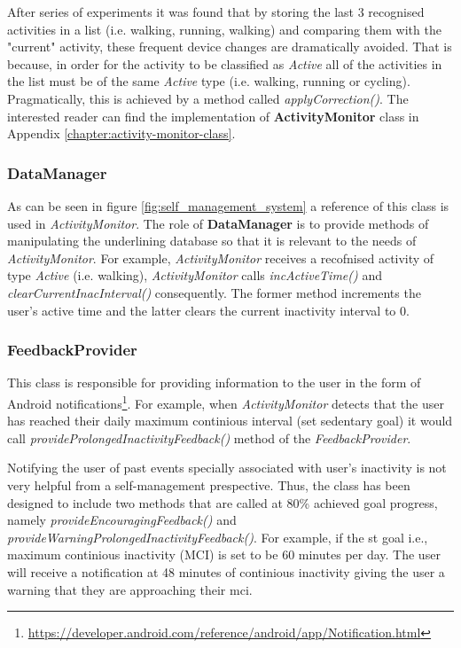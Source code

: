     After series of experiments it was found that by storing the last 3 recognised activities in a list (i.e. walking, running, walking) and comparing them with the "current" activity, these frequent device changes are dramatically avoided. That is because, in order for the activity to be classified as \textit{Active} all of the activities in the list must be of the same \textit{Active} type (i.e. walking, running or cycling). Pragmatically, this is achieved by a method called \textit{applyCorrection()}. The interested reader can find the implementation of \textbf{ActivityMonitor} class in Appendix \ref{chapter:activity-monitor-class}.
    
    \subsubsection{DataManager}
    As can be seen in figure \ref{fig:self_management_system} a reference of this class is used in \textit{ActivityMonitor}. The role of \textbf{DataManager} is to provide methods of manipulating the underlining database so that it is relevant to the needs of \textit{ActivityMonitor}. For example, \textit{ActivityMonitor} receives a recofnised activity of type \textit{Active} (i.e. walking), \textit{ActivityMonitor} calls \textit{incActiveTime()} and \textit{clearCurrentInacInterval()} consequently. The former method increments the user's active time and the latter clears the current inactivity interval to 0.
    
    \subsubsection{FeedbackProvider}
    This class is responsible for providing information to the user in the form of Android notifications\footnote{\url{https://developer.android.com/reference/android/app/Notification.html}}. For example, when \textit{ActivityMonitor} detects that the user has reached their daily maximum continious interval (set sedentary goal) it would call \textit{provideProlongedInactivityFeedback()} method of the \textit{FeedbackProvider}.
    
    Notifying the user of past events specially associated with user's inactivity is not very helpful from a self-management prespective. Thus, the class has been designed to include two methods that are called at 80\% achieved goal progress, namely \textit{provideEncouragingFeedback()} and \textit{provideWarningProlongedInactivityFeedback()}. For example, if the \gls{st} goal i.e., maximum continious inactivity (MCI) is set to be 60 minutes per day. The user will receive a notification at 48 minutes of continious inactivity giving the user a warning that they are approaching their \gls{mci}. 

